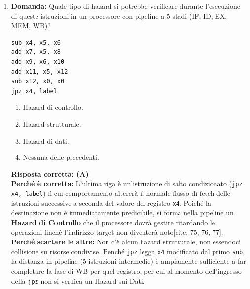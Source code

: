 \documentclass[12pt, a4paper]{article}
\begin{document}
\begin{enumerate}
    \item \textbf{Domanda:} Quale tipo di hazard si potrebbe verificare durante l'esecuzione di queste istruzioni in un processore con pipeline a 5 stadi (IF, ID, EX, MEM, WB)?
\begin{verbatim}
sub x4, x5, x6
add x7, x5, x8
add x9, x6, x10
add x11, x5, x12
sub x12, x0, x0
jpz x4, label
\end{verbatim}
    \begin{enumerate}[label=(\Alph*)]
        \item Hazard di controllo.
        \item Hazard strutturale.
        \item Hazard di dati.
        \item Nessuna delle precedenti.
    \end{enumerate}
    \textbf{Risposta corretta: (A)} \\
    \textbf{Perché è corretta:} L'ultima riga è un'istruzione di salto condizionato (\texttt{jpz x4, label}) il cui comportamento altererà il normale flusso di fetch delle istruzioni successive a seconda del valore del registro \texttt{x4}. Poiché la destinazione non è immediatamente predicibile, si forma nella pipeline un \textbf{Hazard di Controllo} che il processore dovrà gestire ritardando le operazioni finché l'indirizzo target non diventerà noto[cite: 75, 76, 77]. \\
    \textbf{Perché scartare le altre:} Non c'è alcun hazard strutturale, non essendoci collisione su risorse condivise. Benché \texttt{jpz} legga \texttt{x4} modificato dal primo \texttt{sub}, la distanza in pipeline (5 istruzioni intermedie) è ampiamente sufficiente a far completare la fase di WB per quel registro, per cui al momento dell'ingresso della \texttt{jpz} non si verifica un Hazard sui Dati.


\end{enumerate}
\end{document}
